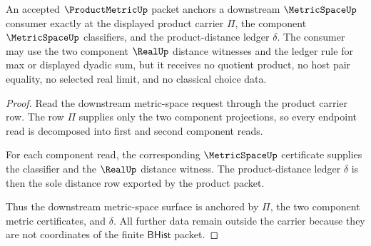 \begin{theorem}
\label{thm:productmetric-metricspace-anchor}
An accepted $\ProductMetricUp$ packet anchors a downstream $\MetricSpaceUp$ consumer exactly at the displayed product carrier $\Pi$, the component $\MetricSpaceUp$ classifiers, and the product-distance ledger $\delta$. The consumer may use the two component $\RealUp$ distance witnesses and the ledger rule for max or displayed dyadic sum, but it receives no quotient product, no host pair equality, no selected real limit, and no classical choice data.
\end{theorem}
\begin{proof}
Read the downstream metric-space request through the product carrier row. The row $\Pi$ supplies only the two component projections, so every endpoint read is decomposed into first and second component reads.

For each component read, the corresponding $\MetricSpaceUp$ certificate supplies the classifier and the $\RealUp$ distance witness. The product-distance ledger $\delta$ is then the sole distance row exported by the product packet.

Thus the downstream metric-space surface is anchored by $\Pi$, the two component metric certificates, and $\delta$. All further data remain outside the carrier because they are not coordinates of the finite $\mathsf{BHist}$ packet.
\end{proof}

